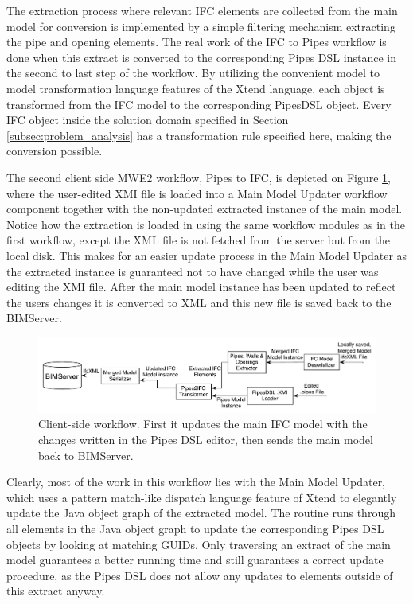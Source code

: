 The extraction process where relevant IFC elements are collected from the main model for conversion is implemented by a simple filtering mechanism extracting the pipe and opening elements. The real work of the IFC to Pipes workflow is done when this extract is converted to the corresponding Pipes DSL instance in the second to last step of the workflow. By utilizing the convenient model to model transformation language features of the Xtend language, each object is transformed from the IFC model to the corresponding PipesDSL object. Every IFC object inside the solution domain specified in Section \ref{subsec:problem_analysis} has a transformation rule specified here, making the conversion possible.

The second client side MWE2 workflow, Pipes to IFC, is depicted on Figure \ref{fig:Pipes2IFCWorkflow}, where the user-edited XMI file is loaded into a Main Model Updater workflow component together with the non-updated extracted instance of the main model. Notice how the extraction is loaded in using the same workflow modules as in the first workflow, except the XML file is not fetched from the server but from the local disk. This makes for an easier update process in the Main Model Updater as the extracted instance is guaranteed not to have changed while the user was editing the XMI file. After the main model instance has been updated to reflect the users changes it is converted to XML and this new file is saved back to the BIMServer.

\begin{figure}[t]
    \centering
        \includegraphics[width=120mm]{images/Pipes2IFC.pdf}
    \caption{Client-side workflow. First it updates the main IFC model with the changes written in the Pipes DSL editor, then sends the main model back to BIMServer.}
    \label{fig:Pipes2IFCWorkflow}
\end{figure}

Clearly, most of the work in this workflow lies with the Main Model Updater, which uses a pattern match-like dispatch language feature of Xtend to elegantly update the Java object graph of the extracted model. The routine runs through all elements in the Java object graph to update the corresponding Pipes DSL objects by looking at matching GUIDs. Only traversing an extract of the main model guarantees a better running time and still guarantees a correct update procedure, as the Pipes DSL does not allow any updates to elements outside of this extract anyway.

